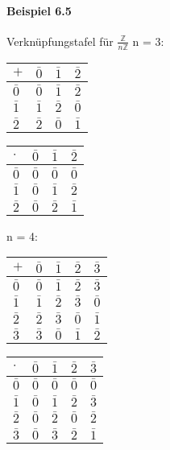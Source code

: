 \documentclass[a4paper]{scrartcl}
\theoremstyle{definition}
\theoremstyle{plain}
\theoremstyle{plain}
\theoremstyle{remark}
\theoremstyle{remark}
\theoremstyle{remark}
\theoremstyle{remark}
\theoremstyle{remark}
\begin{document}
\paragraph{Beispiel 6.5}
\label{sec-3-2-4-2}
Verknüpfungstafel für $\frac{\mathbb{Z}}{n\mathbb{Z}}$
n = 3:
\begin{center}
\begin{tabular}{llll}
$+$ & $\bar 0$ & $\bar 1$ & $\bar 2$\\
\hline
$\bar 0$ & $\bar 0$ & $\bar 1$ & $\bar 2$\\
$\bar 1$ & $\bar 1$ & $\bar 2$ & $\bar 0$\\
$\bar 2$ & $\bar 2$ & $\bar 0$ & $\bar 1$\\
\end{tabular}
\end{center}

\begin{center}
\begin{tabular}{llll}
$\cdot$ & $\bar 0$ & $\bar 1$ & $\bar 2$\\
\hline
$\bar 0$ & $\bar 0$ & $\bar 0$ & $\bar 0$\\
$\bar 1$ & $\bar 0$ & $\bar 1$ & $\bar 2$\\
$\bar 2$ & $\bar 0$ & $\bar 2$ & $\bar 1$\\
\end{tabular}
\end{center}
n = 4:
\begin{center}
\begin{tabular}{lllll}
$+$ & $\bar 0$ & $\bar 1$ & $\bar 2$ & $\bar 3$\\
\hline
$\bar 0$ & $\bar 0$ & $\bar 1$ & $\bar 2$ & $\bar 3$\\
$\bar 1$ & $\bar 1$ & $\bar 2$ & $\bar 3$ & $\bar 0$\\
$\bar 2$ & $\bar 2$ & $\bar 3$ & $\bar 0$ & $\bar 1$\\
$\bar 3$ & $\bar 3$ & $\bar 0$ & $\bar 1$ & $\bar 2$\\
\end{tabular}
\end{center}

\begin{center}
\begin{tabular}{lllll}
$\cdot$ & $\bar 0$ & $\bar 1$ & $\bar 2$ & $\bar 3$\\
\hline
$\bar 0$ & $\bar 0$ & $\bar 0$ & $\bar 0$ & $\bar 0$\\
$\bar 1$ & $\bar 0$ & $\bar 1$ & $\bar 2$ & $\bar 3$\\
$\bar 2$ & $\bar 0$ & $\bar 2$ & $\bar 0$ & $\bar 2$\\
$\bar 3$ & $\bar 0$ & $\bar 3$ & $\bar 2$ & $\bar 1$\\
\end{tabular}
\end{center}
\end{document}
